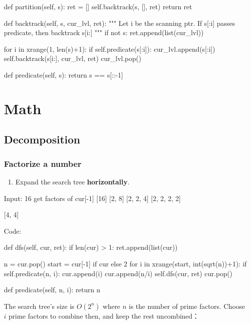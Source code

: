 \begin{python}
def partition(self, s):
    ret = []
    self.backtrack(s, [], ret)
    return ret

def backtrack(self, s, cur_lvl, ret):
    """
    Let i be the scanning ptr.
    If s[:i] passes predicate, then backtrack s[i:]
    """
    if not s:
        ret.append(list(cur_lvl))

    for i in xrange(1, len(s)+1):
        if self.predicate(s[:i]):
            cur_lvl.append(s[:i])
            self.backtrack(s[i:], cur_lvl, ret)
            cur_lvl.pop()

def predicate(self, s):
    return s == s[::-1]
\end{python}



\section{Math}
\subsection{Decomposition}
\subsubsection{Factorize a number}\label{factorization}
\begin{enumerate}
\item Expand the search tree \textbf{horizontally}.
\end{enumerate}
\begin{python}
Input: 16
get factors of cur[-1]
[16]
[2, 8]
[2, 2, 4]
[2, 2, 2, 2]

[4, 4]
\end{python}
Code:
\begin{python}
def dfs(self, cur, ret):
  if len(cur) > 1:
    ret.append(list(cur))

  n = cur.pop()
  start = cur[-1] if cur else 2
  for i in xrange(start, int(sqrt(n))+1):
    if self.predicate(n, i):
      cur.append(i)
      cur.append(n/i)
      self.dfs(cur, ret)
      cur.pop()
            
def predicate(self, n, i):
  return n%
  
\end{python}
 The search tree's size is $O(2^n)$ where $n$ is the number
of prime factors. Choose $i$ prime factors to combine then, and keep the rest uncombined：


